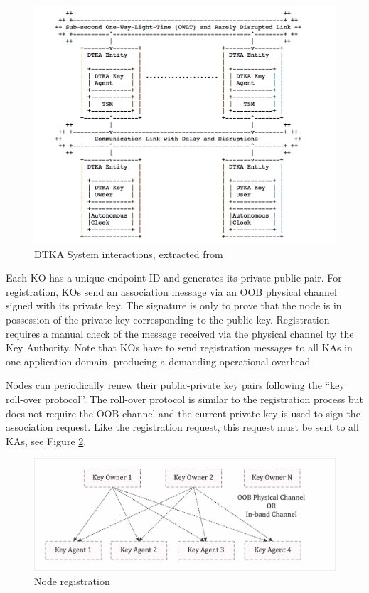 \begin{figure}[htb]
\centering
\includegraphics[width=1 \linewidth]{images/DTKA.png} 
\caption{DTKA System interactions, extracted from \cite{burleigh-dtnwg-dtka-01}}
\label{fig:dtka}
\end{figure}

Each KO has a unique endpoint ID and generates its private-public pair. For registration, KOs send an association message via an OOB physical channel signed with its private key.  The signature is only to prove that the node is in possession of the private key corresponding to the public key. Registration requires a manual check of the message received via the physical channel by the Key Authority. Note that KOs have to send registration messages to all KAs in one application domain, producing a demanding operational overhead

Nodes can periodically renew their public-private key pairs following the ``key roll-over protocol''. The roll-over protocol is similar to the registration process but does not require the OOB channel and the current private key is used to sign the association request. Like the registration request, this request must be sent to all KAs, see Figure \ref{fig:Node registration}.

\begin{figure}[htb]
\centering
\includegraphics[width=1 \linewidth]{images/node-regist.png} 
\caption{Node registration}
\label{fig:Node registration}
\end{figure}

